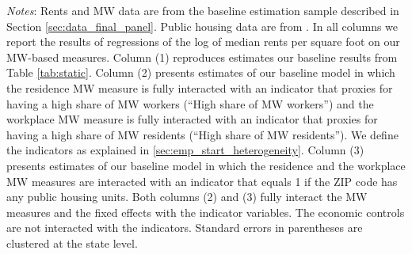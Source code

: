 \begin{table}[hbt!]
    \begin{minipage}{.95\textwidth} \footnotesize
        \vspace{2mm}
        \textit{Notes}: 
        Rents and MW data are from the baseline estimation sample described in Section 
        \ref{sec:data_final_panel}.
        Public housing data are from \textcite{hudHousing}.
        In all columns we report the results of regressions of the log of median rents 
        per square foot on our MW-based measures.
        Column (1) reproduces estimates our baseline results from Table \ref{tab:static}.
        Column (2) presents estimates of our baseline model in which the residence MW 
        measure is fully interacted with an indicator that proxies for having a high share 
        of MW workers (``High share of MW workers'') and the workplace MW measure is 
        fully interacted with an indicator that proxies for having a high share of MW 
        residents (``High share of MW residents'').
        We define the indicators as explained in \ref{sec:emp_start_heterogeneity}.
        Column (3) presents estimates of our baseline model in which the residence and 
        the workplace MW measures are interacted with an indicator that equals 1 if 
        the ZIP code has any public housing units.
        Both columns (2) and (3) fully interact the MW measures and the fixed effects
        with the indicator variables. The economic controls are not interacted with 
        the indicators.
        Standard errors in parentheses are clustered at the state level.
    \end{minipage}
\end{table}
